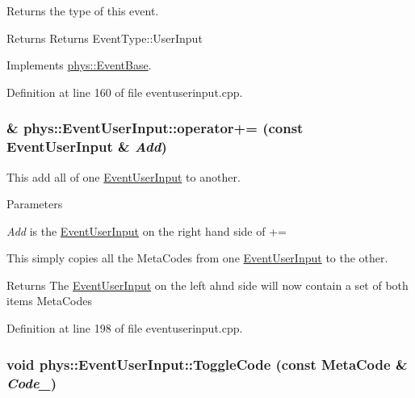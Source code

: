 Returns the type of this event. 

\begin{DoxyReturn}{Returns}
Returns EventType::UserInput 
\end{DoxyReturn}


Implements \hyperlink{classphys_1_1EventBase_a1b3d29b6ecf30f18cc3e1825a515c508}{phys::EventBase}.



Definition at line 160 of file eventuserinput.cpp.

\hypertarget{classphys_1_1EventUserInput_a1d6895e1b3814c1a63f5605b88ba85e5}{
\subsubsection[{operator+=}]{ \& phys::EventUserInput::operator+= (const {\bf EventUserInput} \& {\em Add})}}
\label{d7/df5/classphys_1_1EventUserInput_a1d6895e1b3814c1a63f5605b88ba85e5}


This add all of one \hyperlink{classphys_1_1EventUserInput}{EventUserInput} to another. 


\begin{DoxyParams}{Parameters}
\item[{\em Add}]is the \hyperlink{classphys_1_1EventUserInput}{EventUserInput} on the right hand side of +=\end{DoxyParams}
This simply copies all the MetaCodes from one \hyperlink{classphys_1_1EventUserInput}{EventUserInput} to the other. \begin{DoxyReturn}{Returns}
The \hyperlink{classphys_1_1EventUserInput}{EventUserInput} on the left ahnd side will now contain a set of both items MetaCodes 
\end{DoxyReturn}


Definition at line 198 of file eventuserinput.cpp.

\hypertarget{classphys_1_1EventUserInput_adf603505c43162cf9331a486d5832f75}{
\subsubsection[{ToggleCode}]{\setlength{\rightskip}{0pt plus 5cm}void phys::EventUserInput::ToggleCode (const {\bf MetaCode} \& {\em Code\_\-})}}
\label{d7/df5/classphys_1_1EventUserInput_adf603505c43162cf9331a486d5832f75}



